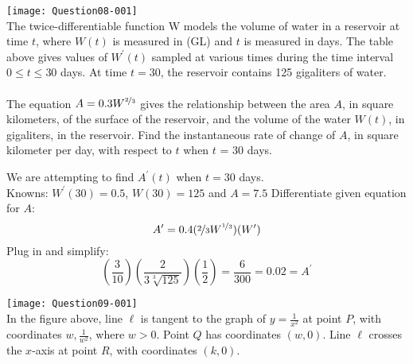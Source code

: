 \documentclass[12pt,letterpaper, onecolumn]{exam}
\begin{document}
\begin{questions}
		\question 
		\question \texttt{[image: Question08-001]}\\
		The twice-differentiable function W models the volume of water in a reservoir at time $t$, where $W(t)$ is measured in (GL) and $t$ is measured in days. The table above gives values of $W^{\prime}(t)$ sampled at various times during the time interval $0 \leq t \leq 30$ days. At time $t = 30$, the reservoir contains 125 gigaliters of water. \\ \\
		The equation $A = 0.3W^{\nicefrac{2}{3}}$ gives the relationship between the area $A$, in square kilometers, of the surface of the reservoir, and the volume of the water $W(t)$, in gigaliters, in the reservoir. Find the instantaneous rate of change of $A$, in square kilometer per day, with respect to $t$ when $t$ = 30 days.
		\begin{solution}
			We are attempting to find $A^{\prime}(t)$ when $t=30$ days. \\
			Knowns: $W^\prime(30) = 0.5$, $W(30)=125$ and $A=7.5$
			Differentiate given equation for $A$:
			$$A^{\prime} = 0.4(\nicefrac{2}{3}W^{\nicefrac{1}{3}})(W^{\prime})$$
			Plug in and simplify:
			$$\left( \frac{3}{10}\right) \left( \frac{2}{3 \sqrt[3]{125}}\right) \left( \frac{1}{2}\right)  = \frac{6}{300} = \boxed{0.02 = A^{\prime}}$$
		\end{solution}
		\question 
		\texttt{[image: Question09-001]} \\
		In the figure above, line $\ell$ is tangent to the graph of $y = \frac{1}{x^2}$ at point $P$, with coordinates $w,\frac{1}{w^2}$, where $w > 0$. Point $Q$ has coordinates $(w, 0)$. Line $\ell$ crosses the $x$-axis at point $R$, with coordinates $(k, 0)$.
			

\end{questions}
\end{document}
